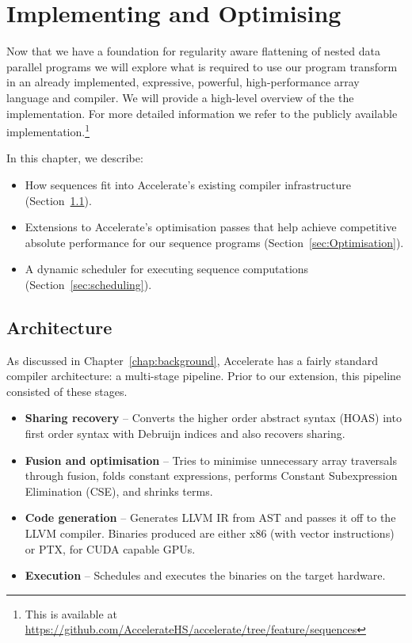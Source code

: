 \chapter{Implementing and Optimising}
\label{chap:implementation}

Now that we have a foundation for regularity aware flattening of nested data parallel programs we will explore what is required to use our program transform in an already implemented, expressive, powerful, high-performance array language and compiler. We will provide a high-level overview of the the implementation. For more detailed information we refer to the publicly available implementation.\footnote{This is available at \url{https://github.com/AccelerateHS/accelerate/tree/feature/sequences}}

In this chapter, we describe:
\begin{itemize}
\item How sequences fit into Accelerate's existing compiler infrastructure (Section~\ref{sec:seq-architecture}).
\item Extensions to Accelerate's optimisation passes that help achieve competitive absolute performance for our sequence programs (Section~\ref{sec:Optimisation}).
\item A dynamic scheduler for executing sequence computations (Section~\ref{sec:scheduling}).
\end{itemize}

\section{Architecture}
\label{sec:seq-architecture}
As discussed in Chapter~\ref{chap:background}, Accelerate has a fairly standard compiler architecture: a multi-stage pipeline. Prior to our extension, this pipeline consisted of these stages.

\begin{itemize}
%
\item \textbf{Sharing recovery} -- Converts the higher order abstract syntax (HOAS) into first order syntax with Debruijn indices and also recovers sharing.
%
%
\item \textbf{Fusion and optimisation} -- Tries to minimise unnecessary array traversals through fusion, folds constant expressions, performs Constant Subexpression Elimination (CSE), and shrinks terms.
%
\item \textbf{Code generation} -- Generates LLVM IR from AST and passes it off to the LLVM compiler. Binaries produced are either x86 (with vector instructions) or PTX, for CUDA capable GPUs.
%
\item \textbf{Execution} -- Schedules and executes the binaries on the target hardware.
\end{itemize}

